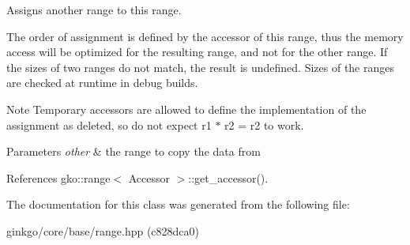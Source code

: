 Assigns another range to this range. 

The order of assignment is defined by the accessor of this range, thus the memory access will be optimized for the resulting range, and not for the other range. If the sizes of two ranges do not match, the result is undefined. Sizes of the ranges are checked at runtime in debug builds.

\begin{DoxyNote}{Note}
Temporary accessors are allowed to define the implementation of the assignment as deleted, so do not expect {\ttfamily r1 $\ast$ r2 = r2} to work.
\end{DoxyNote}

\begin{DoxyParams}{Parameters}
{\em other} & the range to copy the data from \\
\hline
\end{DoxyParams}


References gko\+::range$<$ Accessor $>$\+::get\+\_\+accessor().



The documentation for this class was generated from the following file\+:\begin{DoxyCompactItemize}
\item 
ginkgo/core/base/range.\+hpp (c828dca0)\end{DoxyCompactItemize}
